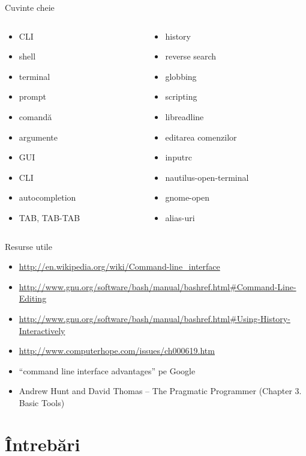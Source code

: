 \documentclass{beamer}
\begin{document}
\begin{frame}{Cuvinte cheie}
	\begin{columns}
		\begin{column}[l]{0.5\textwidth}
			\begin{itemize}
				\item CLI
				\item shell
				\item terminal
				\item prompt
				\item comandă
				\item argumente
				\item GUI
				\item CLI
				\item autocompletion
				\item TAB, TAB-TAB
			\end{itemize}
		\end{column}
		\begin{column}[l]{0.5\textwidth}
			\begin{itemize}
				\item history
				\item reverse search
				\item globbing
				\item scripting
				\item libreadline
				\item editarea comenzilor
				\item inputrc
				\item nautilus-open-terminal
				\item gnome-open
				\item alias-uri
			\end{itemize}
		\end{column}
	\end{columns}
\end{frame}

\begin{frame}{Resurse utile}
	\begin{itemize}
		\small
		\item \url{http://en.wikipedia.org/wiki/Command-line\_interface}
		\item
		\url{http://www.gnu.org/software/bash/manual/bashref.html\#Command-Line-Editing}
		\item
		\url{http://www.gnu.org/software/bash/manual/bashref.html\#Using-History-Interactively}
		\item \url{http://www.computerhope.com/issues/ch000619.htm}
		\normalsize
		\item ``command line interface advantages'' pe Google
		\item Andrew Hunt and David Thomas -- The Pragmatic Programmer
		(Chapter 3. Basic Tools)
	\end{itemize}
\end{frame}

\section{Întrebări}
\end{document}
